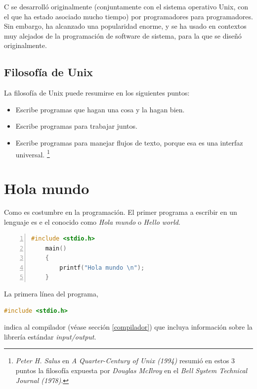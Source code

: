 \documentclass[a4paper, 11pt, titlepage]{article}
\begin{document}
        C se desarrolló originalmente (conjuntamente con el sistema operativo Unix, 
        con el que ha estado asociado mucho tiempo) por programadores para programadores. 
        Sin embargo, ha alcanzado una popularidad enorme, y se ha usado en contextos muy 
        alejados de la programación de software de sistema, para la que se diseñó 
        originalmente. 

    \subsection{Filosofía de Unix}

        La filosofía de Unix puede resumirse en los siguientes puntos:

        \begin{itemize}
            \item Escribe programas que hagan una cosa y la hagan bien.
            \item Escribe programas para trabajar juntos.
            \item Escribe programas para manejar flujos de texto, porque esa es una interfaz 
            universal. \footnote{
                \textit{Peter H. Salus} en \textit{A Quarter-Century of Unix (1994)} resumió 
                en estos 3 puntos la filosofía expuesta por \textit{Douglas McIlroy} en el 
                \textit{Bell System Technical Journal (1978)}.
            }
        \end{itemize}

\section{Hola mundo}

    Como es costumbre en la programación. El primer programa a escribir en un lenguaje es e
    el conocido como \textit{Hola mundo} o \textit{Hello world}.

    \begin{lstlisting}[language=C,numbers=left]
    #include <stdio.h>
    main()
    {
        printf("Hola mundo \n");
    }\end{lstlisting}

    La primera línea del programa, 

    \begin{lstlisting}[language=C]
        #include <stdio.h>\end{lstlisting}

    indica al compilador (véase sección \ref{compilador}) que incluya información 
    sobre la librería estándar \textit{input/output}. 
    
\end{document}

